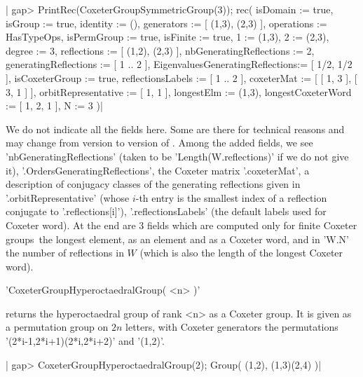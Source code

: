 |    gap> PrintRec(CoxeterGroupSymmetricGroup(3));
    rec(
      isDomain                        := true,
      isGroup                         := true,
      identity                        := (),
      generators                      := [ (1,3), (2,3) ],
      operations                      := HasTypeOps,
      isPermGroup                     := true,
      isFinite                        := true,
      1                               := (1,3),
      2                               := (2,3),
      degree                          := 3,
      reflections                     := [ (1,2), (2,3) ],
      nbGeneratingReflections         := 2,
      generatingReflections           := [ 1 .. 2 ],
      EigenvaluesGeneratingReflections:= [ 1/2, 1/2 ],
      isCoxeterGroup                  := true,
      reflectionsLabels               := [ 1 .. 2 ],
      coxeterMat                      := [ [ 1, 3 ], [ 3, 1 ] ],
      orbitRepresentative             := [ 1, 1 ],
      longestElm                      := (1,3),
      longestCoxeterWord              := [ 1, 2, 1 ],
      N                               := 3 )|

We  do   not  indicate  all  the   fields  here.  Some  are   there  for
technical  reasons   and  may   change  from   version  to   version  of
\CHEVIE.  Among  the  added  fields,  we  see  'nbGeneratingReflections'
(taken  to   be  'Length(W.reflections)'   if  we   do  not   give  it),
'.OrdersGeneratingReflections',  the  Coxeter  matrix  '.coxeterMat',  a
description of conjugacy classes of  the generating reflections given in
'.orbitRepresentative' (whose  $i$-th entry is  the smallest index  of a
reflection  conjugate to  '.reflections[i]'), '.reflectionsLabels'  (the
default labels used for Coxeter word). At the end are 3 fields which are
computed only  for finite Coxeter  groups\:\ the longest element,  as an
element and as a Coxeter word, and in 'W.N' the number of reflections in
$W$ (which is also the length of the longest Coxeter word).


'CoxeterGroupHyperoctaedralGroup( <n> )'

returns the hyperoctaedral group of rank <n> as a Coxeter group. It is
given as a permutation group on $2n$ letters, with Coxeter generators
the permutations '(2*i-1,2*i+1)(2*i,2*i+2)' and '(1,2)'.

|    gap> CoxeterGroupHyperoctaedralGroup(2);
    Group( (1,2), (1,3)(2,4) )|


